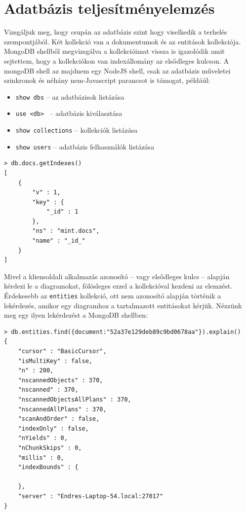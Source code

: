 \section{Adatbázis teljesítményelemzés}
\label{sec:dbprof}
Vizsgáljuk meg, hogy csupán az adatbázis szint hogy viselkedik a terhelés szempontjából. Két kollekció van a dokumentumok és az entitások kollekciója. MongoDB shellből megvizsgálva a kollekcióimat vissza is igazolódik amit sejtettem, hogy a kollekciókon van indexállomány az elsődleges kulcson. A mongoDB shell az majdnem egy NodeJS shell, csak az adatbázis műveletei szinkronok és néhány nem-Javascript parancsot is támogat, példáúl:

\begin{itemize}
\item \lstinline{show dbs} -- az adatbázisok listázása
\item \lstinline{use <db> } -- adatbázis kiválasztása  
\item \lstinline{show collections} -- kollekciók listázása
\item \lstinline{show users} -- adatbázis felhasználók listázása
\end{itemize}

\begin{lstlisting}[caption=A diagram kollekció indexei]
> db.docs.getIndexes()
[
    {
        "v" : 1,
        "key" : {
            "_id" : 1
        },
        "ns" : "mint.docs",
        "name" : "_id_"
    }
]
\end{lstlisting}

Mivel a kliensoldali alkalmazás azonosító -- vagy elsődleges kulcs -- alapján kérdezi le a diagramokat, fölösleges ezzel a kollekcióval kezdeni az elemzést. Érdekesebb az \lstinline{entities} kollekció, ott nem azonosító alapján történik a lekérdezés, amikor egy diagramhoz a tartalmazott entitásokat kérjük.
Nézzünk meg egy ilyen lekérdezést a MongoDB shellben:

\begin{lstlisting}[caption=Az diagram kollekció egy lekérdezésének a query terve]
> db.entities.find({document:"52a37e129deb89c9bd0678aa"}).explain()
{
    "cursor" : "BasicCursor",
    "isMultiKey" : false,
    "n" : 200,
    "nscannedObjects" : 370,
    "nscanned" : 370,
    "nscannedObjectsAllPlans" : 370,
    "nscannedAllPlans" : 370,
    "scanAndOrder" : false,
    "indexOnly" : false,
    "nYields" : 0,
    "nChunkSkips" : 0,
    "millis" : 0,
    "indexBounds" : {

    },
    "server" : "Endres-Laptop-54.local:27017"
}
\end{lstlisting}


